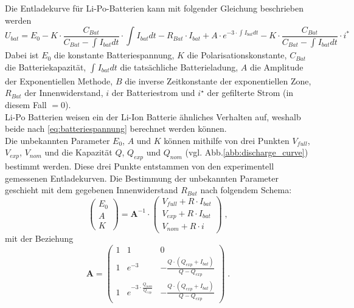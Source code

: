 Die Entladekurve für Li-Po-Batterien kann mit folgender Gleichung beschrieben werden
\begin{equation}
	U_{bat} = E_0-K\cdot\frac{C_{Bat}}{C_{Bat}-\int_{}^{} I_{bat} dt}\cdot\int_{}^{} I_{bat} dt - R_{Bat}\cdot I_{bat}+A\cdot e^{-3\cdot\int_{}^{} I_{bat} dt}-K\cdot\frac{C_{Bat}}{C_{Bat}-\int_{}^{} I_{bat} dt}\cdot i^* \label{eq:batteriespannung}
\end{equation}
Dabei ist \ensuremath{E_0} die konstante Batteriespannung, \ensuremath{K} die Polarisationskonstante, \ensuremath{C_{Bat}} die Batteriekapazität, \ensuremath{\int_{}^{} I_{bat} dt} die tatsächliche Batterieladung, \ensuremath{A} die Amplitude der Exponentiellen Methode, \ensuremath{B} die inverse Zeitkonstante der exponentiellen Zone, \ensuremath{R_{Bat}} der Innenwiderstand, \ensuremath{i} der Batteriestrom und \ensuremath{i^\star} der gefilterte Strom (in diesem Fall \(= 0\)). \\
Li-Po Batterien weisen ein der Li-Ion Batterie ähnliches Verhalten auf, weshalb beide nach \ref{eq:batteriespannung} berechnet werden können.\\
Die unbekannten Parameter \ensuremath{E_0}, \ensuremath{A} und \ensuremath{K} können mithilfe von drei Punkten \ensuremath{V_{full}}, \ensuremath{V_{exp}}, \ensuremath{V_{nom}} und die Kapazität \ensuremath{Q}, \ensuremath{Q_{exp}} und \ensuremath{Q_{nom}} (vgl. Abb.\ref{abb:discharge_curve}) bestimmt werden. Diese drei Punkte entstammen von den experimentell gemessenen Entladekurven.
Die Bestimmung der unbekannten Parameter geschieht mit dem gegebenen Innenwiderstand \ensuremath{R_{Bat}} nach folgendem Schema:
\begin{equation}
	\begin{pmatrix} E_0 \\ A \\ K \end{pmatrix} = \textbf{A}^{-1}\cdot \begin{pmatrix}
	V_{full}+R\cdot I_{bat} \\ V_{exp}+R\cdot I_{bat} \\ V_{nom}+R\cdot i \end{pmatrix}\; ,
\end{equation}
mit der Beziehung
\begin{equation}
	\textbf{A} = \begin{pmatrix}
	1 & 1 & 0 \\ 1 & e^{-3} & -\frac{Q\cdot (Q_{exp}+I_{bat})}{Q-Q_{exp}} \\ 1 & e^{-3\cdot\frac{Q_{nom}}{Q_{exp}}} & -\frac{Q\cdot (Q_{exp}+I_{bat})}{Q-Q_{exp}}
	\end{pmatrix}\; .
\end{equation}
